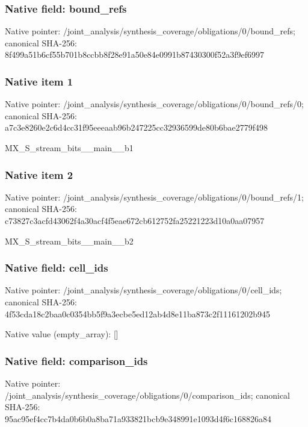 \documentclass[10pt,a4paper]{article}
\begin{document}
\subsubsection{Native field: bound\_\allowbreak{}refs}
Native pointer: /joint\_\allowbreak{}analysis/synthesis\_\allowbreak{}coverage/obligations/0/bound\_\allowbreak{}refs; canonical SHA-256: 8f499a51b6cf55b701b8ccbb8f28e91a50e84e0991b87430300f52a3f9ef6997

\subsubsection{Native item 1}
Native pointer: /joint\_\allowbreak{}analysis/synthesis\_\allowbreak{}coverage/obligations/0/bound\_\allowbreak{}refs/0; canonical SHA-256: a7c3e8260e2c6d4cc31f95eeeaab96b247225cc32936599de80b6bae2779f498

\begingroup\raggedright\sloppy MX\_\allowbreak{}S\_\allowbreak{}stream\_\allowbreak{}bits\_\allowbreak{}\_\allowbreak{}main\_\allowbreak{}\_\allowbreak{}b1\par\endgroup

\subsubsection{Native item 2}
Native pointer: /joint\_\allowbreak{}analysis/synthesis\_\allowbreak{}coverage/obligations/0/bound\_\allowbreak{}refs/1; canonical SHA-256: c73827c3acfd43062f4a30acf4f5eae672cb612752fa25221223d10a0aa07957

\begingroup\raggedright\sloppy MX\_\allowbreak{}S\_\allowbreak{}stream\_\allowbreak{}bits\_\allowbreak{}\_\allowbreak{}main\_\allowbreak{}\_\allowbreak{}b2\par\endgroup

\subsubsection{Native field: cell\_\allowbreak{}ids}
Native pointer: /joint\_\allowbreak{}analysis/synthesis\_\allowbreak{}coverage/obligations/0/cell\_\allowbreak{}ids; canonical SHA-256: 4f53cda18c2baa0c0354bb5f9a3ecbe5ed12ab4d8e11ba873c2f11161202b945

Native value (empty\_\allowbreak{}array): []

\subsubsection{Native field: comparison\_\allowbreak{}ids}
Native pointer: /joint\_\allowbreak{}analysis/synthesis\_\allowbreak{}coverage/obligations/0/comparison\_\allowbreak{}ids; canonical SHA-256: 95ac95ef4cc7b4da0b6b0a8ba71a933821bcb9e348991e1093d4f6c168826a84
\end{document}

